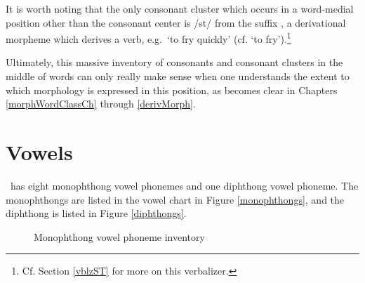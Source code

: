 It is worth noting that the only consonant cluster which occurs in a word-medial position other than the consonant center is /st/ from the suffix , a derivational morpheme
which derives a verb, e.g.\, ‘to fry quickly’ (cf.  ‘to fry’).\footnote{Cf. Section \ref{vblzST} for more on this verbalizer.} %

Ultimately, this massive inventory of consonants and consonant clusters in the middle of words can only really make sense when one understands the extent to which morphology is expressed in this position, as becomes clear in Chapters \ref{morphWordClassCh} through \ref{derivMorph}. 




\section{Vowels}\label{vowels}\label{vowelPhonemes}
\PS\ has eight monophthong vowel phonemes and one diphthong vowel phoneme. The monophthongs are listed in the vowel chart in Figure \vref{monophthongs}, and the diphthong is listed in Figure \vref{diphthongs}. 
\begin{figure}[t]
\centering
\begin{vowel} %
\end{vowel}
\caption[Monophthong inventory]{Monophthong vowel phoneme inventory} \label{monophthongs}
\end{figure}


